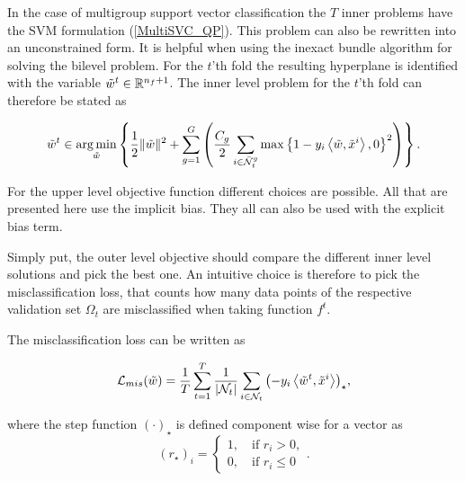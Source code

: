 In the case of multigroup support vector classification the \(T\) inner problems have the SVM formulation %
(\ref{MultiSVC_QP}). %
This problem can also be rewritten into an unconstrained form. It is helpful when using the inexact bundle algorithm for solving the bilevel problem.
For the \(t\)'th fold the resulting hyperplane is identified with the variable \(\tilde{w}^t \in \mathbb{R}^{n_f+1}\).
The inner level problem for the \(t\)'th fold can therefore be stated as



\begin{equation}
	\tilde{w}^t \in \operatorname*{arg\,min}_{\tilde{w}} \left\{\frac{1}{2} \|\tilde{w}\|^2+\sum_{g=1}^G\left(\frac{C_g}{2}\sum_{i\in \bar{\mathcal{N}}_t^g}{\max\left\{1-y_i\left\langle \tilde{w},\tilde{x}^i\right\rangle,0\right\}^2}\right)\right\}.
\label{lower_unconstr}
\end{equation}


For the upper level objective function different choices are possible. All that are presented here use the implicit bias. They all can also be used with the explicit bias term.

Simply put, the outer level objective should compare the different inner level solutions and pick the best one. An intuitive choice is therefore to pick the misclassification loss, that counts how many data points of the respective validation set \(\Omega_t\) are misclassified when taking function \(f^t\).

The misclassification loss can be written as

\begin{equation}
	\mathcal{L}_{mis}(\tilde{w}) = \frac{1}{T}\sum_{t=1}^T\frac{1}{|\mathcal{N}_t|}\sum_{i \in \mathcal{N}_t}{\left(-y_i\left\langle \tilde{w}^t,\tilde{x}^i\right\rangle\right)_{\star}},
\label{misclass_loss}
\end{equation}

where the step function \((\cdot)_{\star}\) is defined component wise for a vector as
\begin{equation}
	(r_{\star})_i = \left\{\begin{array}{c} 1, \quad \text{if } r_i > 0, \\ 0, \quad \text{if } r_i \leq 0 \end{array} \right. .
\label{step_fun}
\end{equation}

